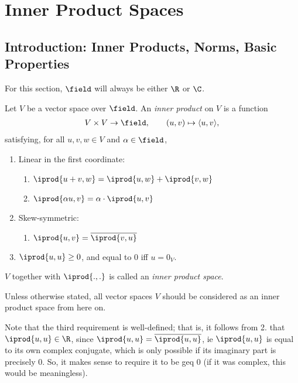 \section{Inner Product Spaces}

\subsection{Introduction: Inner Products, Norms, Basic Properties}

For this section, $\field$ will always be either $\R$ or $\C$.

\begin{definition}
    Let $V$ be a vector space over $\field$. An \emph{inner product} on $V$ is a function \begin{align*}
        V \times V  \to \field, \qquad (u, v) \mapsto \langle u, v\rangle,
    \end{align*}
    satisfying, for all $u, v,w \in V$ and $\alpha \in \field$, 
    \begin{enumerate}
        \item Linear in the first coordinate:
        \begin{enumerate}
            \item $\iprod{u + v, w} = \iprod{u,w} + \iprod{v, w}$
            \item $\iprod{\alpha u, v} = \alpha \cdot \iprod{u, v}$
        \end{enumerate}
        \item Skew-symmetric:
        \begin{enumerate}
            \item $\iprod{u, v} = \overline{\iprod{v, u}}$
        \end{enumerate}
        \item $\iprod{u, u} \geq 0$, and equal to $0$ iff $u = 0_V$.
    \end{enumerate}
    $V$ together with $\iprod{.,.}$ is called an \emph{inner product space}.
\end{definition}

Unless otherwise stated, all vector spaces $V$ should be considered as an inner product space from here on.
\begin{remark}
 Note that the third requirement is well-defined; that is, it follows from 2. that $\iprod{u,u} \in \R$, since $\iprod{u, u} =\overline{\iprod{u, u}}$, ie $\iprod{u, u}$ is equal to its own complex conjugate, which is only possible if its imaginary part is precisely 0. So, it makes sense to require it to be geq 0 (if it was complex, this would be meaningless).
\end{remark}

